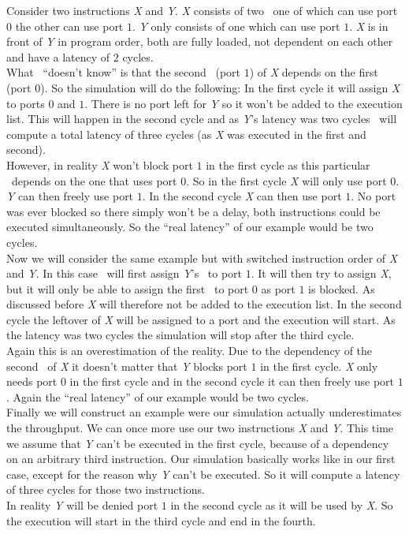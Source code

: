 Consider two instructions \emph{X} and \emph{Y}. \emph{X} consists of two \microops\ one of which can use port $0$ the other can use port $1$. \emph{Y} only consists of one which can use port $1$. \emph{X} is in front of \emph{Y} in program order, both are fully loaded, not dependent on each other and have a latency of $2$ cycles.\\
What \suaca\ ``doesn't know'' is that the second \microop\ (port $1$) of \emph{X} depends on the first (port $0$). So the simulation will do the following: In the first cycle it will assign \emph{X} to ports $0$ and $1$. There is no port left for \emph{Y} so it won't be added to the execution list. This will happen in the second cycle and as \emph{Y}'s latency was two cycles \suaca\ will compute a total latency of three cycles (as \emph{X} was executed in the first and second).\\
However, in reality \emph{X} won't block port $1$ in the first cycle as this particular \microop\ depends on the one that uses port $0$. So in the first cycle \emph{X} will only use port $0$. \emph{Y} can then freely use port $1$. In the second cycle \emph{X} can then use port $1$. No port was ever blocked so there simply won't be a delay, both instructions could be executed simultaneously. So the ``real latency'' of our example would be two cycles.\\

Now we will consider the same example but with switched instruction order of \emph{X} and \emph{Y}. In this case \suaca\ will first assign \emph{Y}'s \microop\ to port $1$. It will then try to assign \emph{X}, but it will only be able to assign the first \microop\ to port $0$ as port $1$ is blocked. As discussed before \emph{X} will therefore not be added to the execution list. In the second cycle the leftover of \emph{X} will be assigned to a port and the execution will start. As the latency was two cycles the simulation will stop after the third cycle.\\
Again this is an overestimation of the reality. Due to the dependency of the second \microop\ of \emph{X} it doesn't matter that \emph{Y} blocks port $1$ in the first cycle. \emph{X} only needs port $0$ in the first cycle and in the second cycle it can then freely use port $1$. Again the ``real latency'' of our example would be two cycles.\\

Finally we will construct an example were our simulation actually underestimates the throughput. We can once more use our two instructions \emph{X} and \emph{Y}. This time we assume that \emph{Y} can't be executed in the first cycle, because of a dependency on an arbitrary third instruction. Our simulation basically works like in our first case, except for the reason why \emph{Y} can't be executed. So it will compute a latency of three cycles for those two instructions.\\
In reality \emph{Y} will be denied port $1$ in the second cycle as it will be used by \emph{X}. So the execution will start in the third cycle and end in the fourth.\\


